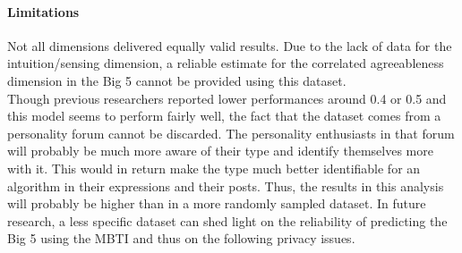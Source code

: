 \paragraph{Limitations} Not all dimensions delivered equally valid results. Due to the lack of data for the intuition/sensing dimension, a reliable estimate for the correlated agreeableness dimension in the Big 5 cannot be provided using this dataset.\\
Though previous researchers reported lower performances around 0.4 or 0.5 \cite{gjurkovic_reddit:_2018,kosinski_private_2013,kosinski_manifestations_2014} and this model seems to perform fairly well, the fact that the dataset comes from a personality forum cannot be discarded. The personality enthusiasts in that forum will probably be much more aware of their type and identify themselves more with it. This would in return make the type much better identifiable for an algorithm in their expressions and their posts. Thus, the results in this analysis will probably be higher than in a more randomly sampled dataset. In future research, a less specific dataset can shed light on the reliability of predicting the Big 5 using the MBTI and thus on the following privacy issues.